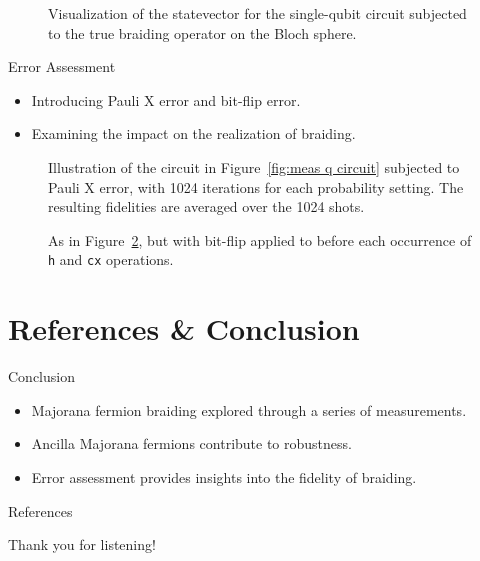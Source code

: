 \documentclass{loyola-beamer}
\def\c#1{\texttt{#1}}
\begin{document}
\begin{frame}
	\begin{figure}
		\begin{center}
			
		\end{center}
		\caption{Visualization of the statevector for the single-qubit circuit subjected to the true braiding operator on the Bloch sphere.}\label{fig:br in bloch}
	\end{figure}
\end{frame}

\begin{frame}{Error Assessment}
	\begin{itemize}
		\item Introducing Pauli X error and bit-flip error.
		\item Examining the impact on the realization of braiding.
	\end{itemize}
\end{frame}

\begin{frame}
	\begin{figure}
		\begin{center}
			
		\end{center}
		\caption{Illustration of the circuit in Figure~\ref{fig:meas q circuit} subjected to Pauli X error, with 1024 iterations for each probability setting. The resulting fidelities are averaged over the 1024 shots.}\label{fig:with bit flip error}
	\end{figure}
\end{frame}

\begin{frame}
	\begin{figure}
		\begin{center}
			
		\end{center}
		\caption{As in Figure~\ref{fig:with bit flip error}, but with bit-flip applied to before each occurrence of \c{h} and \c{cx} operations.}\label{fig:bit flip error on cx}
	\end{figure}
\end{frame}

\section{References \& Conclusion}

\begin{frame}{Conclusion}
	\begin{itemize}
		\item Majorana fermion braiding explored through a series of measurements.
		\item Ancilla Majorana fermions contribute to robustness.
		\item Error assessment provides insights into the fidelity of braiding.
	\end{itemize}
\end{frame}

\begin{frame}{References}
	
	
\end{frame}

\begin{titleframe}{Thank you for listening!}
\end{titleframe}
\end{document}
